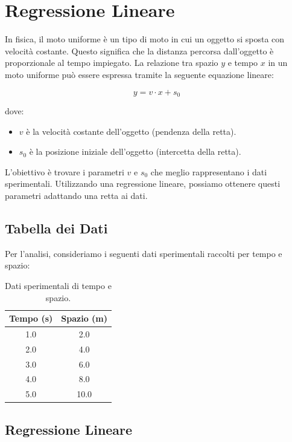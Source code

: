 \documentclass[a4paper,12pt]{article}
\begin{document}
\section{Regressione Lineare}
In fisica, il moto uniforme è un tipo di moto in cui un oggetto si sposta con velocità costante. Questo significa che la distanza percorsa dall'oggetto è proporzionale al tempo impiegato. La relazione tra spazio \( y \) e tempo \( x \) in un moto uniforme può essere espressa tramite la seguente equazione lineare:

\[
y = v \cdot x + s_0
\]

dove:
\begin{itemize}
    \item \( v \) è la velocità costante dell'oggetto (pendenza della retta).
    \item \( s_0 \) è la posizione iniziale dell'oggetto (intercetta della retta).
\end{itemize}

L'obiettivo è trovare i parametri \( v \) e \( s_0 \) che meglio rappresentano i dati sperimentali. Utilizzando una regressione lineare, possiamo ottenere questi parametri adattando una retta ai dati.

\subsection{Tabella dei Dati}

Per l'analisi, consideriamo i seguenti dati sperimentali raccolti per tempo e spazio:

\begin{table}[h!]
    \centering
    \begin{tabular}{|c|c|}
    \hline
    \textbf{Tempo (\si{\second})} & \textbf{Spazio (\si{\meter})} \\
    \hline
    1.0 & 2.0 \\
    2.0 & 4.0 \\
    3.0 & 6.0 \\
    4.0 & 8.0 \\
    5.0 & 10.0 \\
    \hline
    \end{tabular}
    \caption{Dati sperimentali di tempo e spazio.}
    \label{tab:dati}
\end{table}

\subsection{Regressione Lineare}
\end{document}
